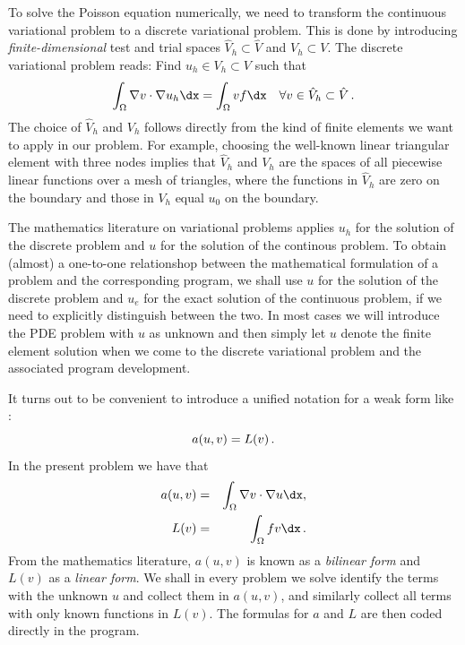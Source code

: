 To solve the Poisson equation numerically, we need to transform the
continuous variational problem 
to a discrete variational
problem. This is done by introducing \emph{finite-dimensional} test and
trial spaces $\hat{V}_h\subset\hat{V}$ and $V_h\subset{V}$. The
discrete variational problem reads:
Find $u_h \in V_h \subset V$ such that
\begin{equation} \label{langtangen:poisson1:vard}
  \int_{\Omega} \nabla v \cdot \nabla u_h \dx =
  \int_{\Omega} v f \dx
  \quad \forall v \in \hat{V}_h \subset \hat{V}\langtangenep
\end{equation}
The choice of $\hat{V}_h$ and $V_h$ follows directly from the
kind of finite elements we want to apply in our problem. For example,
choosing the well-known linear triangular element with three nodes
implies that
$\hat V_h$ and $V_h$ are the spaces of all piecewise linear functions
over a mesh of triangles,
where the functions in $\hat V_h$
are zero on the boundary
and those in $V_h$ equal $u_0$ on the boundary.

The mathematics literature on variational problems applies $u_h$ for
the solution of the discrete problem and $u$ for the solution of the
continous problem. To obtain (almost) a one-to-one relationshop between
the mathematical formulation of a problem and the corresponding \fenics{}
program, we shall use $u$ for the solution of the discrete problem
and $u_{e}$ for the exact solution of the continuous problem,
if we need to explicitly distinguish between the two.
In most cases we will introduce the PDE problem with $u$ as unknown and
then simply let $u$ denote the finite element solution when we come
to the discrete variational problem and the associated program development.

It turns out to be convenient to
introduce a unified notation for a weak form
like :
\begin{equation}
a(u, v) = L(v)\thinspace .
\end{equation}
In the present problem we have that
\begin{eqnarray}
a(u, v) &=& \int_{\Omega} \nabla v \cdot \nabla u \dx,
\label{langtangen:poisson1:vard:a}\\
L(v) &=& \int_{\Omega} fv \dx\langtangenep\label{langtangen:poisson1:vard:L}
\end{eqnarray}
From the mathematics literature,
$a(u,v)$ is known as a \emph{bilinear form} and $L(v)$ as a
\emph{linear form}.
We shall in every problem we solve identify the terms with the
unknown $u$ and collect them in $a(u,v)$, and similarly collect
all terms with only known functions in $L(v)$. The formulas for $a$ and
$L$ are then coded directly in the program.

